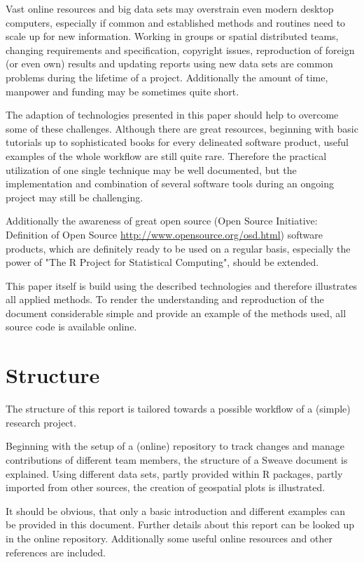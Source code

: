 \documentclass{ifacconf}
\begin{document}
Vast online resources and big data sets may overstrain
even modern desktop computers, especially if common and established methods
and routines need to scale up for new information. 
Working in groups or spatial distributed teams,  
changing requirements and specification, copyright issues, reproduction of 
foreign (or even own) results  and updating reports using new data sets are common 
problems during the lifetime of a project. 
Additionally the amount of time, manpower and funding 
may be sometimes quite short.

The adaption of technologies presented in this paper should help to overcome
some of these challenges. Although there are great resources, beginning with 
basic tutorials up to sophisticated books for every delineated software product,
useful examples of the whole workflow are still quite rare. Therefore the 
practical utilization of one single technique may be well documented, but
the implementation and combination of several software tools during an ongoing
project may still be challenging.

Additionally the awareness of great open source
(Open Source Initiative: Definition of Open Source \url{http://www.opensource.org/osd.html}) 
software products, which are 
definitely ready to be used on a regular basis, especially the power of "The R Project
for Statistical Computing", should be extended.

This paper itself is build using the described technologies and therefore illustrates 
all applied methods. To render the understanding and reproduction of the document 
considerable simple and provide an example of the methods used, all source code is
available online.

\section{Structure}
The structure of this report is tailored towards a possible workflow of a (simple)
research project. 

Beginning with the setup of a (online) repository to track changes and manage 
contributions of different team members, the structure of a Sweave document is
explained. Using different data sets, partly provided within R packages, partly
imported from other sources, the creation of geospatial plots is illustrated. 

It should be obvious, that only a basic introduction and different examples 
can be provided in this document. Further details about this report can be
looked up in the online repository. Additionally some useful online resources
and other references are included.
\end{document}
